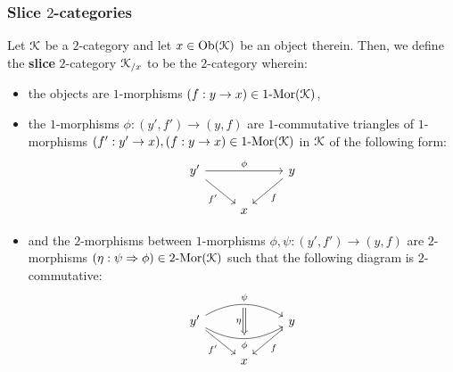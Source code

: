         \subsubsection{Slice \texorpdfstring{$2$}{}-categories}
            \begin{definition} \label{def: slice_2_categories}
                Let $\mathcal{K}$ be a $2$-category and let $x \in \mathrm{Ob}(\mathcal{K})$ be an object therein. Then, we define the \textbf{slice} $2$-category $\mathcal{K}_{/x}$ to be the $2$-category wherein:
                    \begin{itemize}
                        \item the objects are $1$-morphisms $(f: y \to x) \in 1\text{-}\mathrm{Mor}(\mathcal{K})$,
                        \item the $1$-morphisms $\phi: (y', f') \to (y, f)$ are $1$-commutative triangles of $1$-morphisms $(f': y' \to x), (f: y \to x) \in 1\text{-}\mathrm{Mor}(\mathcal{K})$ in $\mathcal{K}$ of the following form:
                            $$
                                \begin{tikzcd}
                                	{y'} && y \\
                                	& x
                                	\arrow["\phi", from=1-1, to=1-3]
                                	\arrow["{f'}"', from=1-1, to=2-2]
                                	\arrow["f", from=1-3, to=2-2]
                                \end{tikzcd}
                            $$
                        \item and the $2$-morphisms between $1$-morphisms $\phi, \psi: (y', f') \to (y, f)$ are $2$-morphisms $(\eta: \psi \Rightarrow \phi) \in 2\text{-}\mathrm{Mor}(\mathcal{K})$ such that the following diagram is $2$-commutative:
                            $$
                                \begin{tikzcd}
                                	{y'} && y \\
                                	& x
                                	\arrow[""{name=0, anchor=center, inner sep=0}, "\phi"', bend right, from=1-1, to=1-3]
                                	\arrow["{f'}"', from=1-1, to=2-2]
                                	\arrow["f", from=1-3, to=2-2]
                                	\arrow[""{name=1, anchor=center, inner sep=0}, "\psi", bend left, from=1-1, to=1-3]
                                	\arrow[shorten <=2pt, shorten >=2pt, Rightarrow, from=1, to=0, "\eta"']
                                \end{tikzcd}
                            $$
                    \end{itemize}
            \end{definition}
